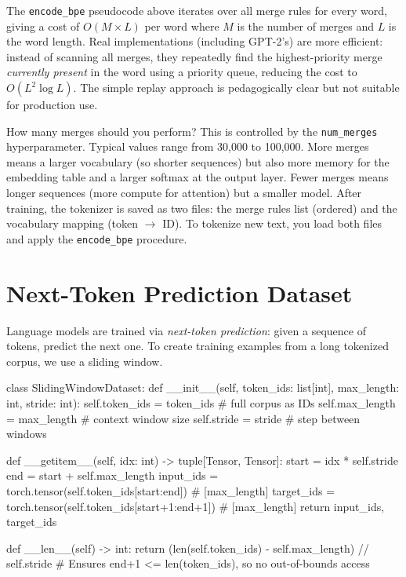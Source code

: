 \begin{keyconcept}
  The \texttt{encode\_bpe} pseudocode above iterates over all merge rules
  for every word, giving a cost of $O(M \times L)$ per word where $M$ is
  the number of merges and $L$ is the word length. Real implementations
  (including GPT-2's) are more efficient: instead of scanning all merges,
  they repeatedly find the highest-priority merge \emph{currently present}
  in the word using a priority queue, reducing the cost to $O(L^2 \log L)$.
  The simple replay approach is pedagogically clear but not suitable for
  production use.
\end{keyconcept}

\begin{keyconcept}
  How many merges should you perform? This is controlled by the
  \texttt{num\_merges} hyperparameter. Typical values range from 30{,}000 to
  100{,}000. More merges means a larger vocabulary (so shorter sequences)
  but also more memory for the embedding table and a larger softmax at the
  output layer. Fewer merges means longer sequences (more compute for
  attention) but a smaller model. After training, the tokenizer is saved
  as two files: the merge rules list (ordered) and the vocabulary mapping
  (token $\rightarrow$ ID). To tokenize new text, you load both files and
  apply the \texttt{encode\_bpe} procedure.
\end{keyconcept}

\section{Next-Token Prediction Dataset}

Language models are trained via \emph{next-token prediction}: given a
sequence of tokens, predict the next one. To create training examples
from a long tokenized corpus, we use a sliding window.

\begin{pseudocode}
class SlidingWindowDataset:
    def __init__(self, token_ids: list[int], max_length: int, stride: int):
        self.token_ids = token_ids                  # full corpus as IDs
        self.max_length = max_length                # context window size
        self.stride = stride                        # step between windows

    def __getitem__(self, idx: int) -> tuple[Tensor, Tensor]:
        start = idx * self.stride
        end = start + self.max_length
        input_ids = torch.tensor(self.token_ids[start:end])       # [max_length]
        target_ids = torch.tensor(self.token_ids[start+1:end+1])  # [max_length]
        return input_ids, target_ids

    def __len__(self) -> int:
        return (len(self.token_ids) - self.max_length) // self.stride
        # Ensures end+1 <= len(token_ids), so no out-of-bounds access
\end{pseudocode}

